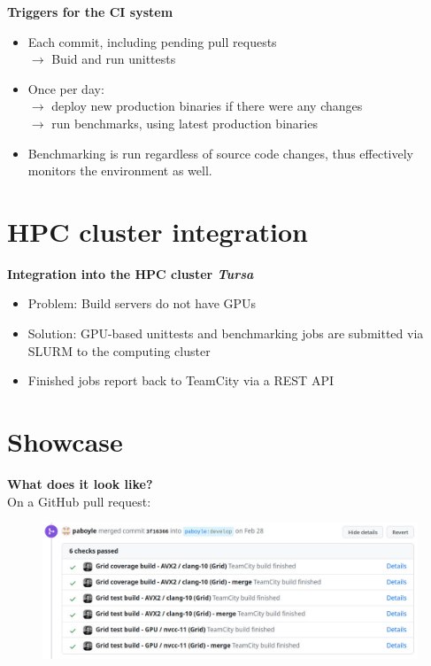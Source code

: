 \documentclass[english,xcolor=pst,11pt]{beamer}
\begin{document}
\begin{frame}
 \textbf{Triggers for the CI system}
\begin{itemize}
 \item Each commit, including pending pull requests \\$\longrightarrow$ Buid and run unittests
 \item Once per day: \\$\longrightarrow$ deploy new production binaries if there were any changes \\
 $\longrightarrow$ run benchmarks, using latest production binaries
 \item Benchmarking is run regardless of source code changes, thus effectively monitors the environment as well.
\end{itemize}
\end{frame}

\section{HPC cluster integration}
\begin{frame}
 \textbf{Integration into the HPC cluster \emph{Tursa}}
 \begin{itemize}
  \item Problem: Build servers do not have GPUs
  \item Solution: GPU-based unittests and benchmarking jobs are submitted via SLURM to the computing cluster
  \item Finished jobs report back to TeamCity via a REST API
 \end{itemize}

\end{frame}

\section{Showcase}
\begin{frame}
 \textbf{What does it look like?}\\
 On a GitHub pull request:
  \begin{figure}[H]
	\centering
    {\includegraphics[width=4.5in]{diagrams/pr.jpg}}
\end{figure}
\end{frame}
\end{document}
